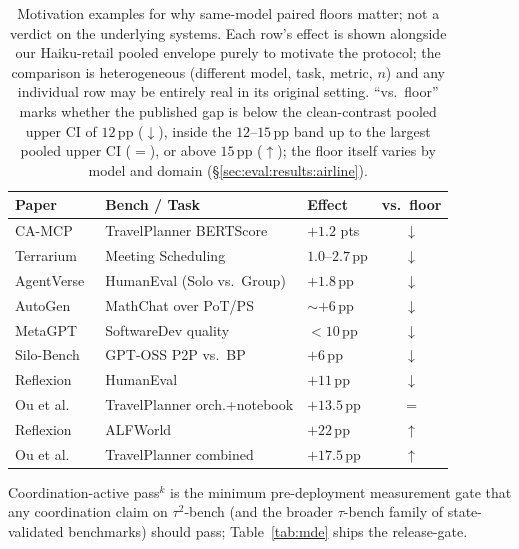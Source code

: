 \begin{table}[t]
\centering
\caption{Motivation examples for why same-model paired floors
matter; not a verdict on the underlying systems. Each row's
effect is shown alongside our Haiku-retail pooled envelope
purely to motivate the protocol; the comparison is heterogeneous
(different model, task, metric, $n$) and any individual row may
be entirely real in its original setting. ``vs.\ floor'' marks
whether the published gap is below the clean-contrast pooled
upper CI of $12$\,pp ($\downarrow$), inside the $12$--$15$\,pp
band up to the largest pooled upper CI ($=$), or above
$15$\,pp ($\uparrow$); the floor itself varies by model
and domain (\S\ref{sec:eval:results:airline}).}
\label{tab:literature-vs-floor}
\small
\setlength{\tabcolsep}{4pt}
\begin{tabular}{lll@{\hspace{6pt}}c}
\toprule
Paper & Bench / Task & Effect & vs.\ floor \\
\midrule
CA-MCP~\cite{camcp2026}            & TravelPlanner BERTScore & $+1.2$ pts & $\downarrow$ \\
Terrarium~\cite{terrarium2025}     & Meeting Scheduling      & $1.0$--$2.7$\,pp & $\downarrow$ \\
AgentVerse~\cite{agentverse2023}   & HumanEval (Solo vs.\ Group)  & $+1.8$\,pp  & $\downarrow$ \\
AutoGen~\cite{autogen2023}         & MathChat over PoT/PS    & $\sim$$+6$\,pp & $\downarrow$ \\
MetaGPT~\cite{metagpt2024}         & SoftwareDev quality     & $<10$\,pp & $\downarrow$ \\
Silo-Bench~\cite{silobench2026}    & GPT-OSS P2P vs.\ BP     & $+6$\,pp & $\downarrow$ \\
Reflexion~\cite{reflexion2023}     & HumanEval                  & $+11$\,pp   & $\downarrow$ \\
\midrule
Ou et al.~\cite{ou2025coordination} & TravelPlanner orch.+notebook & $+13.5$\,pp & $=$ \\
\midrule
Reflexion~\cite{reflexion2023}     & ALFWorld                    & $+22$\,pp & $\uparrow$ \\
Ou et al.~\cite{ou2025coordination} & TravelPlanner combined     & $+17.5$\,pp & $\uparrow$ \\
\bottomrule
\end{tabular}
\end{table}

Coordination-active pass$^k$ is the minimum pre-deployment
measurement gate that any coordination claim on $\tau^2$-bench
(and the broader $\tau$-bench family of state-validated
benchmarks) should pass; Table~\ref{tab:mde} ships the
release-gate.

